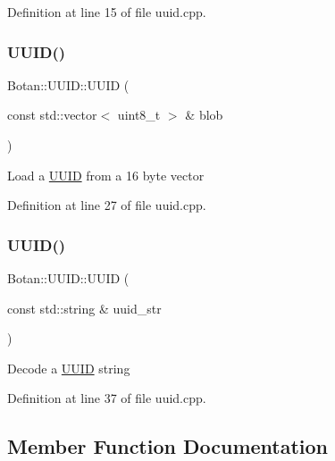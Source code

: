Definition at line 15 of file uuid.\+cpp.

\mbox{\label{class_botan_1_1_u_u_i_d_af2a8c7fb0ea61e9bb8c3a58a71c28724}} 
\subsubsection{\texorpdfstring{U\+U\+I\+D()}{UUID()}\hspace{0.1cm}{\footnotesize\ttfamily [3/4]}}
{\footnotesize\ttfamily Botan\+::\+U\+U\+I\+D\+::\+U\+U\+ID (\begin{DoxyParamCaption}\item[{const std\+::vector$<$ uint8\+\_\+t $>$ \&}]{blob }\end{DoxyParamCaption})}

Load a \mbox{\hyperlink{class_botan_1_1_u_u_i_d}{U\+U\+ID}} from a 16 byte vector 

Definition at line 27 of file uuid.\+cpp.

\mbox{\label{class_botan_1_1_u_u_i_d_a621acc4dc66a8a330048588b23f61ae3}} 
\subsubsection{\texorpdfstring{U\+U\+I\+D()}{UUID()}\hspace{0.1cm}{\footnotesize\ttfamily [4/4]}}
{\footnotesize\ttfamily Botan\+::\+U\+U\+I\+D\+::\+U\+U\+ID (\begin{DoxyParamCaption}\item[{const std\+::string \&}]{uuid\+\_\+str }\end{DoxyParamCaption})}

Decode a \mbox{\hyperlink{class_botan_1_1_u_u_i_d}{U\+U\+ID}} string 

Definition at line 37 of file uuid.\+cpp.



\subsection{Member Function Documentation}
\mbox{\label{class_botan_1_1_u_u_i_d_a707abb917ddb4996dbe987015cfac23c}} 
